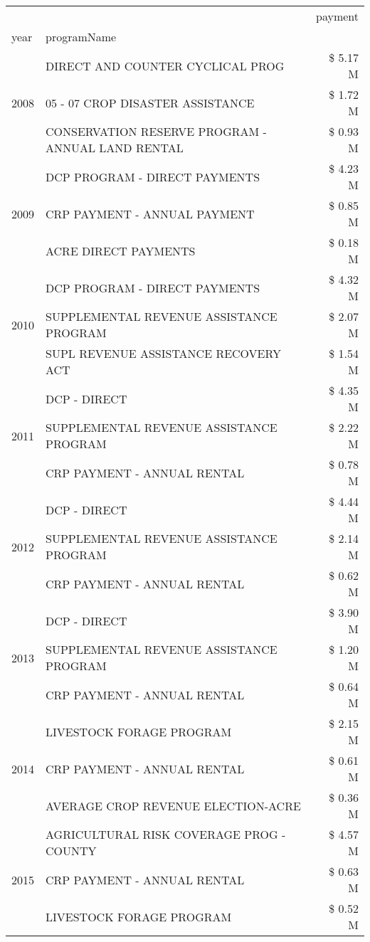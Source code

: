 \begin{tabular}{llr}
\toprule
 &  & payment \\
year & programName &  \\
\midrule
\multirow[t]{3}{*}{2008} & DIRECT AND COUNTER CYCLICAL PROG & \$ 5.17 M \\
 & 05 - 07 CROP DISASTER ASSISTANCE & \$ 1.72 M \\
 & CONSERVATION RESERVE PROGRAM - ANNUAL LAND RENTAL & \$ 0.93 M \\
\cline{1-3}
\multirow[t]{3}{*}{2009} & DCP PROGRAM - DIRECT PAYMENTS & \$ 4.23 M \\
 & CRP PAYMENT - ANNUAL PAYMENT & \$ 0.85 M \\
 & ACRE DIRECT PAYMENTS & \$ 0.18 M \\
\cline{1-3}
\multirow[t]{3}{*}{2010} & DCP PROGRAM - DIRECT PAYMENTS & \$ 4.32 M \\
 & SUPPLEMENTAL REVENUE ASSISTANCE PROGRAM & \$ 2.07 M \\
 & SUPL REVENUE ASSISTANCE RECOVERY ACT & \$ 1.54 M \\
\cline{1-3}
\multirow[t]{3}{*}{2011} & DCP - DIRECT & \$ 4.35 M \\
 & SUPPLEMENTAL REVENUE ASSISTANCE PROGRAM & \$ 2.22 M \\
 & CRP PAYMENT - ANNUAL RENTAL & \$ 0.78 M \\
\cline{1-3}
\multirow[t]{3}{*}{2012} & DCP - DIRECT & \$ 4.44 M \\
 & SUPPLEMENTAL REVENUE ASSISTANCE PROGRAM & \$ 2.14 M \\
 & CRP PAYMENT - ANNUAL RENTAL & \$ 0.62 M \\
\cline{1-3}
\multirow[t]{3}{*}{2013} & DCP - DIRECT & \$ 3.90 M \\
 & SUPPLEMENTAL REVENUE ASSISTANCE PROGRAM & \$ 1.20 M \\
 & CRP PAYMENT - ANNUAL RENTAL & \$ 0.64 M \\
\cline{1-3}
\multirow[t]{3}{*}{2014} & LIVESTOCK FORAGE PROGRAM & \$ 2.15 M \\
 & CRP PAYMENT - ANNUAL RENTAL & \$ 0.61 M \\
 & AVERAGE CROP REVENUE ELECTION-ACRE & \$ 0.36 M \\
\cline{1-3}
\multirow[t]{3}{*}{2015} & AGRICULTURAL RISK COVERAGE PROG - COUNTY & \$ 4.57 M \\
 & CRP PAYMENT - ANNUAL RENTAL & \$ 0.63 M \\
 & LIVESTOCK FORAGE PROGRAM & \$ 0.52 M \\
\cline{1-3}

\end{tabular}
